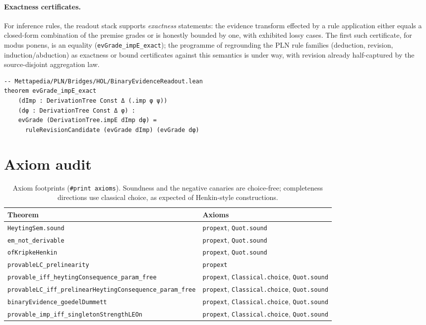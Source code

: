 \documentclass[11pt]{article}
\newcommand{\code}[1]{\texttt{#1}}
\theoremstyle{plain}
\theoremstyle{definition}
\begin{document}
\paragraph{Exactness certificates.}  For inference rules, the readout stack
supports \emph{exactness} statements: the evidence transform effected by a
rule application either equals a closed-form combination of the premise
grades or is honestly bounded by one, with exhibited lossy cases.  The first
such certificate, for modus ponens, is an equality
(\code{evGrade\_impE\_exact}); the programme of regrounding the PLN rule
families (deduction, revision, induction/abduction) as exactness or bound
certificates against this semantics is under way, with revision already
half-captured by the source-disjoint aggregation law.

\begin{lstlisting}
-- Mettapedia/PLN/Bridges/HOL/BinaryEvidenceReadout.lean
theorem evGrade_impE_exact
    (dImp : DerivationTree Const Δ (.imp φ ψ))
    (dφ : DerivationTree Const Δ φ) :
    evGrade (DerivationTree.impE dImp dφ) =
      ruleRevisionCandidate (evGrade dImp) (evGrade dφ)
\end{lstlisting}

\section{Axiom audit}\label{sec:audit}

\begin{table}[h]
\centering\footnotesize
\begin{tabular}{ll}
\toprule
Theorem & Axioms\\
\midrule
\code{HeytingSem.sound} & \code{propext}, \code{Quot.sound}\\
\code{em\_not\_derivable} & \code{propext}, \code{Quot.sound}\\
\code{ofKripkeHenkin} & \code{propext}, \code{Quot.sound}\\
\code{provableLC\_prelinearity} & \code{propext}\\
\code{provable\_iff\_heytingConsequence\_param\_free} &
  \code{propext}, \code{Classical.choice}, \code{Quot.sound}\\
\code{provableLC\_iff\_prelinearHeytingConsequence\_param\_free} &
  \code{propext}, \code{Classical.choice}, \code{Quot.sound}\\
\code{binaryEvidence\_goedelDummett} &
  \code{propext}, \code{Classical.choice}, \code{Quot.sound}\\
\code{provable\_imp\_iff\_singletonStrengthLEOn} &
  \code{propext}, \code{Classical.choice}, \code{Quot.sound}\\
\bottomrule
\end{tabular}
\caption{Axiom footprints (\code{\#print axioms}).  Soundness and the
negative canaries are choice-free; completeness directions use classical
choice, as expected of Henkin-style constructions.}
\label{tab:audit}
\end{table}
\end{document}
